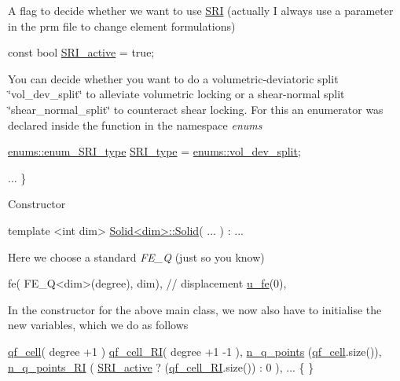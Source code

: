  A flag to decide whether we want to use \hyperlink{namespaceSRI}{S\+RI} (actually I always use a parameter in the prm file to change element formulations) 
\begin{DoxyCode}
\textcolor{keyword}{const} \textcolor{keywordtype}{bool} \hyperlink{assembly__routine__SRI_8cc_a535468030220abae9305a26e9d7f7401}{SRI\_active} = \textcolor{keyword}{true};
\end{DoxyCode}
 You can decide whether you want to do a volumetric-\/deviatoric split \char`\"{}vol\+\_\+dev\+\_\+split\char`\"{} to alleviate volumetric locking or a shear-\/normal split \char`\"{}shear\+\_\+normal\+\_\+split\char`\"{} to counteract shear locking. For this an enumerator was declared inside the function in the namespace {\itshape enums} 
\begin{DoxyCode}
     \hyperlink{namespaceenums_ad159a7d6539f111883db3b07c09601a8}{enums::enum\_SRI\_type} \hyperlink{assembly__routine__SRI_8cc_a163566963ded80f68a5bbc6d04ce0adf}{SRI\_type} = 
      \hyperlink{namespaceenums_ad159a7d6539f111883db3b07c09601a8ad2c871b65148302b24a39fac6cedfd40}{enums::vol\_dev\_split};
 
     ...
\}
\end{DoxyCode}
 Constructor 
\begin{DoxyCode}
\textcolor{keyword}{template} <\textcolor{keywordtype}{int} dim>
\hyperlink{assembly__routine__SRI_8cc_a031582e4b219de9cc57c78ebd20a2fc3}{Solid<dim>::Solid}( ... )
:
...
\end{DoxyCode}
 Here we choose a standard {\itshape F\+E\+\_\+Q} (just so you know) 
\begin{DoxyCode}
fe( FE\_Q<dim>(degree), dim),    \textcolor{comment}{// displacement}
\hyperlink{assembly__routine__SRI_8cc_ae50a49c136e49c33fcd5a555a00009dd}{u\_fe}(0),
\end{DoxyCode}
 In the constructor for the above main class, we now also have to initialise the new variables, which we do as follows 
\begin{DoxyCode}
\hyperlink{assembly__routine__SRI_8cc_aaaceb34a5b42a4954b2e893607c1bdef}{qf\_cell}( degree +1 )
\hyperlink{assembly__routine__SRI_8cc_ab9727a7376e2656d3cd40c65ac7efb81}{qf\_cell\_RI}( degree +1 -1 ),
\hyperlink{assembly__routine__SRI_8cc_afd52b693751274175b93a58458201e6b}{n\_q\_points} (\hyperlink{assembly__routine__SRI_8cc_aaaceb34a5b42a4954b2e893607c1bdef}{qf\_cell}.size()),
\hyperlink{assembly__routine__SRI_8cc_a0b72b2a33d52b7597b87df35b5b92415}{n\_q\_points\_RI} ( \hyperlink{assembly__routine__SRI_8cc_a535468030220abae9305a26e9d7f7401}{SRI\_active} ? (\hyperlink{assembly__routine__SRI_8cc_ab9727a7376e2656d3cd40c65ac7efb81}{qf\_cell\_RI}.size()) : 0 ),
...
\{
\}
\end{DoxyCode}
